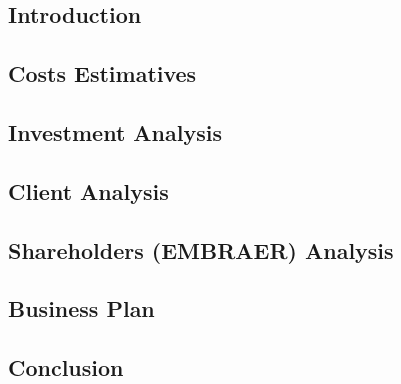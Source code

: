 \subsection{Introduction}
     

\subsection{Costs Estimatives}
     

\subsection{Investment Analysis}
     
	\subsection{Client Analysis}
        
    \subsection{Shareholders (EMBRAER) Analysis}
        
        
\subsection{Business Plan}
    

\subsection{Conclusion}
    